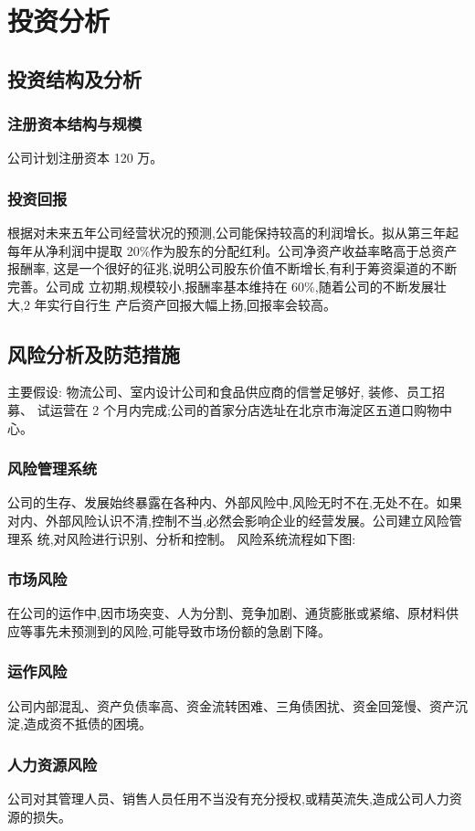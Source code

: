\chapter{投资分析}
\section{投资结构及分析}
\subsection{注册资本结构与规模}
公司计划注册资本 120 万。
\subsection{投资回报}
根据对未来五年公司经营状况的预测,公司能保持较高的利润增长。拟从第三年起
每年从净利润中提取 20\%作为股东的分配红利。公司净资产收益率略高于总资产报酬率,
这是一个很好的征兆,说明公司股东价值不断增长,有利于筹资渠道的不断完善。公司成
立初期,规模较小,报酬率基本维持在 60\%,随着公司的不断发展壮大,2 年实行自行生
产后资产回报大幅上扬,回报率会较高。

\section{风险分析及防范措施}
主要假设: 物流公司、室内设计公司和食品供应商的信誉足够好, 装修、员工招募、
试运营在 2 个月内完成;公司的首家分店选址在北京市海淀区五道口购物中心。
\subsection{风险管理系统}
公司的生存、发展始终暴露在各种内、外部风险中,风险无时不在,无处不在。如果
对内、外部风险认识不清,控制不当,必然会影响企业的经营发展。公司建立风险管理系
统,对风险进行识别、分析和控制。
风险系统流程如下图:
\subsection{市场风险}
在公司的运作中,因市场突变、人为分割、竞争加剧、通货膨胀或紧缩、原材料供
应等事先未预测到的风险,可能导致市场份额的急剧下降。
\subsection{运作风险}
公司内部混乱、资产负债率高、资金流转困难、三角债困扰、资金回笼慢、资产沉
淀,造成资不抵债的困境。
\subsection{人力资源风险}
公司对其管理人员、销售人员任用不当没有充分授权,或精英流失,造成公司人力资
源的损失。
